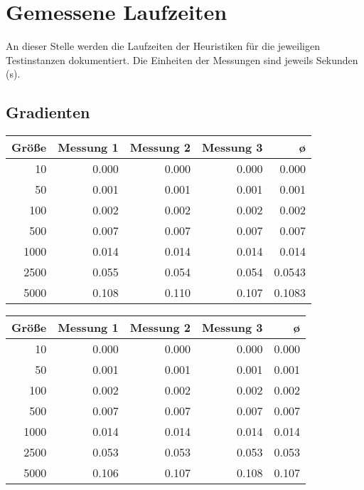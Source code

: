 \documentclass[a4paper, 10pt, twoside, onecolumn, parskip]{scrartcl}
\begin{document}
    \section{Gemessene Laufzeiten} \label{sec:laufzeiten}
    An dieser Stelle werden die Laufzeiten der Heuristiken für die jeweiligen Testinstanzen dokumentiert.
    Die Einheiten der Messungen sind jeweils Sekunden (s).

    \subsection{Gradienten} \label{subsec:gradienten}

    \begin{center}
        \begin{tabular}{|r|r|r|r|r|}
            \hline
            Größe & Messung 1 & Messung 2 & Messung 3 & ø \\ \hline
            10 & 0.000 & 0.000 & 0.000 & 0.000 \\ \hline
            50 & 0.001 & 0.001 & 0.001 & 0.001 \\ \hline
            100 & 0.002 & 0.002 & 0.002 & 0.002 \\ \hline
            500 & 0.007 & 0.007 & 0.007 & 0.007 \\ \hline
            1000 & 0.014 & 0.014 & 0.014 & 0.014 \\ \hline
            2500 & 0.055 & 0.054 & 0.054 & 0.0543 \\ \hline
            5000 & 0.108 & 0.110 & 0.107 & 0.1083 \\ \hline
        \end{tabular}
    \end{center}

    \begin{center}
        \begin{tabular}{|r|r|r|r|r|}
            \hline
            Größe & Messung 1 & Messung 2 & Messung 3 & ø \\ \hline
            10 & 0.000 & 0.000 & 0.000 & 0.000 \\ \hline
            50 & 0.001 & 0.001 & 0.001 & 0.001 \\ \hline
            100 & 0.002 & 0.002 & 0.002 & 0.002 \\ \hline
            500 & 0.007 & 0.007 & 0.007 & 0.007 \\ \hline
            1000 & 0.014 & 0.014 & 0.014 & 0.014 \\ \hline
            2500 & 0.053 & 0.053 & 0.053 & 0.053 \\ \hline
            5000 & 0.106 & 0.107 & 0.108 & 0.107 \\ \hline
        \end{tabular}
    \end{center}
\end{document}
